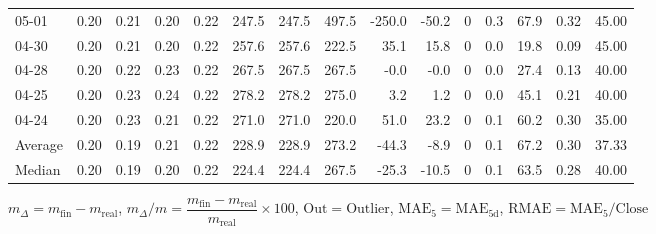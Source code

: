 \begin{threeparttable}
{\begin{tabular}{lrrrrrrrrrrrrrr}
  05-01 &          0.20 &          0.21 &          0.20 &        0.22 &               247.5 &              247.5 &               497.5 &     -250.0 &        -50.2 &              0 &                 0.3 &             67.9 &            0.32 &                  45.00 \\
  04-30 &          0.20 &          0.21 &          0.20 &        0.22 &               257.6 &              257.6 &               222.5 &       35.1 &         15.8 &              0 &                 0.0 &             19.8 &            0.09 &                  45.00 \\
  04-28 &          0.20 &          0.22 &          0.23 &        0.22 &               267.5 &              267.5 &               267.5 &       -0.0 &         -0.0 &              0 &                 0.0 &             27.4 &            0.13 &                  40.00 \\
  04-25 &          0.20 &          0.23 &          0.24 &        0.22 &               278.2 &              278.2 &               275.0 &        3.2 &          1.2 &              0 &                 0.0 &             45.1 &            0.21 &                  40.00 \\
  04-24 &          0.20 &          0.23 &          0.21 &        0.22 &               271.0 &              271.0 &               220.0 &       51.0 &         23.2 &              0 &                 0.1 &             60.2 &            0.30 &                  35.00 \\
Average &          0.20 &          0.19 &          0.21 &        0.22 &               228.9 &              228.9 &               273.2 &      -44.3 &         -8.9 &              0 &                 0.1 &             67.2 &            0.30 &                  37.33 \\
 Median &          0.20 &          0.19 &          0.20 &        0.22 &               224.4 &              224.4 &               267.5 &      -25.3 &        -10.5 &              0 &                 0.1 &             63.5 &            0.28 &                  40.00 \\
\bottomrule
\end{tabular}
}
\begin{tablenotes}\footnotesize
\item $m_\Delta=m_{\text{fin}}-m_{\text{real}}$,
$m_\Delta/m=\dfrac{m_{\text{fin}}-m_{\text{real}}}{m_{\text{real}}}\times100$,
$\mathrm{Out}=\text{Outlier}$,
$\mathrm{MAE}_5=\mathrm{MAE}_{5\text{d}}$,
$\mathrm{RMAE}=\mathrm{MAE}_5/\text{Close}$
\end{tablenotes}
\end{threeparttable}
\endgroup

